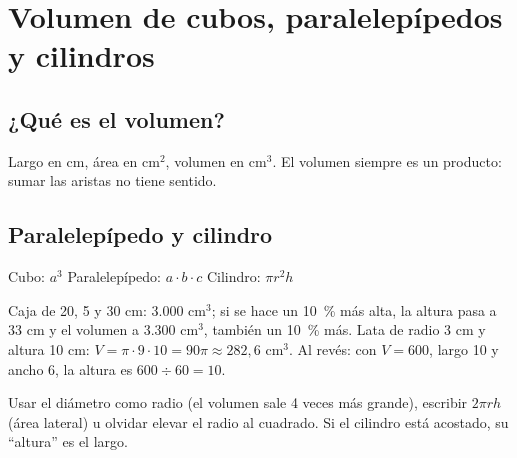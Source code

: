 \section{Volumen de cubos, paralelepípedos y cilindros}
\subsection{¿Qué es el volumen?}
\begin{ojo} Largo en cm, área en cm$^2$, volumen en cm$^3$. El volumen siempre es un producto: sumar las aristas no tiene sentido.\end{ojo}

\subsection{Paralelepípedo y cilindro}
\begin{clave}[Volumen = área de la base $\times$ altura] Cubo: $a^3$ \qquad Paralelepípedo: $a \cdot b \cdot c$ \qquad Cilindro: $\pi r^2 h$\end{clave}
\begin{ejemplo} Caja de 20, 5 y 30 cm: $3.000$ cm$^3$; si se hace un 10~\% más alta, la altura pasa a 33 cm y el volumen a $3.300$ cm$^3$, también un 10~\% más. Lata de radio 3 cm y altura 10 cm: $V = \pi \cdot 9 \cdot 10 = 90\pi \approx 282{,}6$ cm$^3$. Al revés: con $V = 600$, largo 10 y ancho 6, la altura es $600 \div 60 = 10$.\end{ejemplo}
\begin{ojo} Usar el diámetro como radio (el volumen sale 4 veces más grande), escribir $2\pi r h$ (área lateral) u olvidar elevar el radio al cuadrado. Si el cilindro está acostado, su ``altura'' es el largo.\end{ojo}

